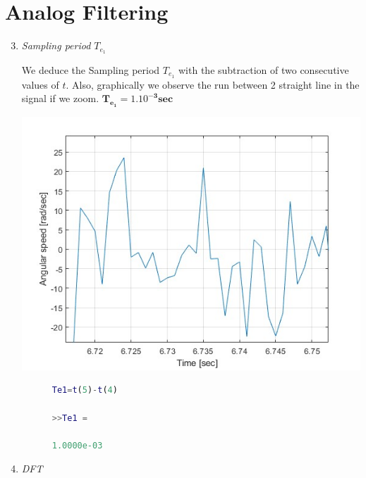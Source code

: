 \documentclass[a4paper,12pt]{article}
\begin{document}
\section{Analog Filtering}
\begin{enumerate}[label={\color{blue}\arabic*)}]
  \setcounter{enumi}{2}
  \item \emph{Sampling period \(T_{e_1}\)}
  
  We deduce the Sampling period \(T_{e_1}\) with the subtraction of two consecutive values of \(t\). Also, graphically we observe the run between 2 straight line in the signal if we zoom. \(\mathbf{T_{e_1}=1.10^{-3} sec}\) 
  \begin{multicols}{2}
    \begin{center}
      \includegraphics[scale=0.3]{Figures/q3.jpg}
      \label{F2}
    \end{center}
    \columnbreak
    
    \begin{lstlisting}[style=Matlab-editor,language=Matlab, caption={Code for Figure 2}, captionpos=b, basicstyle=\small\ttfamily]
      %% Sampling period
      Te1=t(5)-t(4)

      >>Te1 =

      1.0000e-03
      \end{lstlisting}
    \end{multicols}
  \item \emph{DFT}
  

\end{enumerate}
\end{document}
